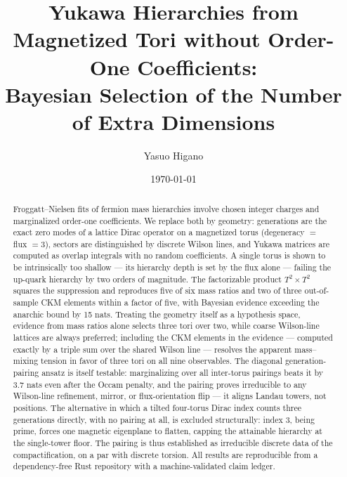 \documentclass[aps,prd,preprint,nofootinbib]{revtex4-2}
\begin{document}
\title{Yukawa Hierarchies from Magnetized Tori without Order-One Coefficients:\\
Bayesian Selection of the Number of Extra Dimensions}

\author{Yasuo Higano}

\date{\today}

\begin{abstract}
Froggatt--Nielsen fits of fermion mass hierarchies involve chosen integer
charges and marginalized order-one coefficients. We replace both by geometry:
generations are the exact zero modes of a lattice Dirac operator on a
magnetized torus (degeneracy $=$ flux $=3$), sectors are distinguished by
discrete Wilson lines, and Yukawa matrices are computed as overlap integrals
with no random coefficients. A single torus is shown to be intrinsically too
shallow --- its hierarchy depth is set by the flux alone --- failing the
up-quark hierarchy by two orders of magnitude. The factorizable product
$T^2\times T^2$ squares the suppression and reproduces five of six mass ratios
and two of three out-of-sample CKM elements within a factor of five, with
Bayesian evidence exceeding the anarchic bound by 15 nats. Treating the
geometry itself as a hypothesis space, evidence from mass ratios alone selects
three tori over two, while coarse Wilson-line lattices are always preferred;
including the CKM elements in the evidence --- computed exactly by a triple sum
over the shared Wilson line --- resolves the apparent mass--mixing tension in
favor of three tori on all nine observables. The diagonal generation-pairing
ansatz is itself testable: marginalizing over all inter-torus pairings beats it
by 3.7 nats even after the Occam penalty, and the pairing proves irreducible to
any Wilson-line refinement, mirror, or flux-orientation flip --- it aligns
Landau towers, not positions. The alternative in which a tilted four-torus
Dirac index counts three generations directly, with no pairing at all, is
excluded structurally: index 3, being prime, forces one magnetic eigenplane to
flatten, capping the attainable hierarchy at the single-tower floor. The
pairing is thus established as irreducible discrete data of the
compactification, on a par with discrete torsion. All results are reproducible
from a dependency-free Rust repository with a machine-validated claim ledger.
\end{abstract}

\maketitle
\end{document}
